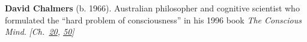 \textbf{David Chalmers} (b. 1966). Australian philosopher and cognitive scientist who formulated the ``hard problem of consciousness'' in his 1996 book \emph{The Conscious Mind}. \emph{[Ch.~\hyperref[ch:chineseroomargument]{20}, \hyperref[ch:consciousness]{50}]}

